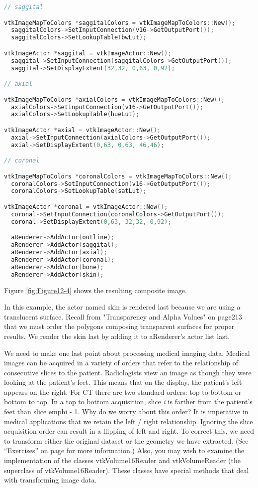 \begin{lstlisting}[language=C++, caption={Mapping the image data and displaying the image slices.}]
// saggital

vtkImageMapToColors *saggitalColors = vtkImageMapToColors::New();
  saggitalColors->SetInputConnection(v16->GetOutputPort());
  saggitalColors->SetLookupTable(bwLut);

vtkImageActor *saggital = vtkImageActor::New();
  saggital->SetInputConnection(saggitalColors->GetOutputPort());
  saggital->SetDisplayExtent(32,32, 0,63, 0,92);

// axial

vtkImageMapToColors *axialColors = vtkImageMapToColors::New();
  axialColors->SetInputConnection(v16->GetOutputPort());
  axialColors->SetLookupTable(hueLut);

vtkImageActor *axial = vtkImageActor::New();
  axial->SetInputConnection(axialColors->GetOutputPort());
  axial->SetDisplayExtent(0,63, 0,63, 46,46);

// coronal

vtkImageMapToColors *coronalColors = vtkImageMapToColors::New();
  coronalColors->SetInputConnection(v16->GetOutputPort());
  coronalColors->SetLookupTable(satLut);

vtkImageActor *coronal = vtkImageActor::New();
  coronal->SetInputConnection(coronalColors->GetOutputPort());
  coronal->SetDisplayExtent(0,63, 32,32, 0,92);

  aRenderer->AddActor(outline);
  aRenderer->AddActor(saggital);
  aRenderer->AddActor(axial);
  aRenderer->AddActor(coronal);
  aRenderer->AddActor(bone);
  aRenderer->AddActor(skin);
\end{lstlisting}

Figure \ref{fig:Figure12-4} shows the resulting composite image.

In this example, the actor named skin is rendered last because we are using a translucent surface. Recall from "Transparency and Alpha Values" on page213 that we must order the polygons  composing transparent surfaces for proper results. We render the skin last by adding it to aRenderer's actor list last.

We need to make one last point about processing medical imaging data. Medical images can be acquired in a variety of orders that refer to the relationship of consecutive slices to the patient. Radiologists view an image as though they were looking at the patient's feet. This means that on the display, the patient's left appears on the right. For CT there are two standard orders: top to bottom or bottom to top. In a top to bottom acquisition, slice \emph{i} is farther from the patient's feet than slice emph{i} - 1. Why do we worry about this order? It is imperative in medical applications that we retain the left / right relationship. Ignoring the slice acquisition order can result in a flipping of left and right. To correct this, we need to transform either the original dataset or the geometry we have extracted. (See ``Exercises'' on page \pageref{exercises:ch_12} for more information.) Also, you may wish to examine the implementation of the classes vtkVolume16Reader and vtkVolumeReader (the superclass of vtkVolume16Reader). These classes have special methods that deal with transforming image data.

